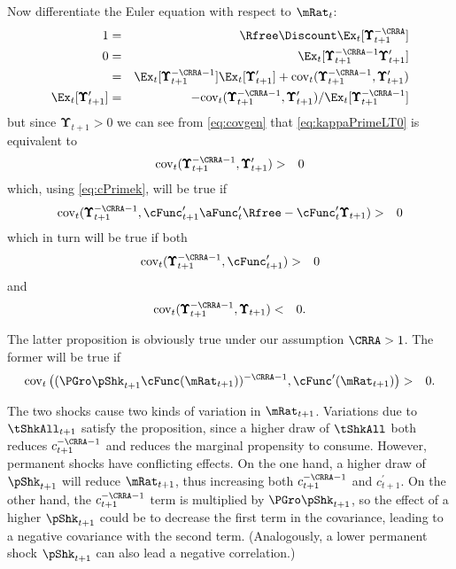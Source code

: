 \documentclass[titlepage]{\econtex}\providecommand{\texname}{BufferStockTheory}%
\begin{document}
{Now differentiate the Euler equation with respect to $\mRat_{t}$:
\begin{eqnarray}
  1 & = & \Rfree \Discount \Ex_{t}[ \pmb{\Upsilon}_{t+1}^{-\CRRA}] \notag
\\ 0 & = & \Ex_{t}[\pmb{\Upsilon}_{t+1}^{-\CRRA-1} \pmb{\Upsilon}_{t+1}^{\prime}] \notag
\\ & = & \Ex_{t}[\pmb{\Upsilon}_{t+1}^{-\CRRA-1}]\Ex_{t}[\pmb{\Upsilon}_{t+1}^{\prime}]+\mbox{cov}_{t}(\pmb{\Upsilon}_{t+1}^{-\CRRA-1},\pmb{\Upsilon}_{t+1}^{\prime}) \notag
\\ \Ex_{t}[\pmb{\Upsilon}_{t+1}^{\prime}] & = & -\mbox{cov}_{t}(\pmb{\Upsilon}_{t+1}^{-\CRRA-1},\pmb{\Upsilon}_{t+1}^{\prime})/\Ex_{t}[\pmb{\Upsilon}_{t+1}^{-\CRRA-1}] \label{eq:covgen}
\end{eqnarray}
but since $\pmb{\Upsilon}_{t+1} > 0$ we can see from \eqref{eq:covgen} that \eqref{eq:kappaPrimeLT0} is equivalent to
\begin{eqnarray}
 \mbox{cov}_{t}(\pmb{\Upsilon}_{t+1}^{-\CRRA-1},\pmb{\Upsilon}_{t+1}^{\prime}) & > & 0 \nonumber
\end{eqnarray}
which, using \eqref{eq:cPrimek}, will be true if
\begin{eqnarray}
 \mbox{cov}_{t}(\pmb{\Upsilon}_{t+1}^{-\CRRA-1},\cFunc^{\prime}_{t+1}\aFunc^{\prime}_{t}\Rfree - \cFunc^{\prime}_{t}\pmb{\Upsilon}_{t+1}) & > & 0 \notag
\end{eqnarray}
which in turn will be true if both
\begin{eqnarray}
  \mbox{cov}_{t}(\pmb{\Upsilon}_{t+1}^{-\CRRA-1},\cFunc^{\prime}_{t+1} ) & > & 0 \notag
\end{eqnarray}
and
\begin{eqnarray*}
  \mbox{cov}_{t}(\pmb{\Upsilon}_{t+1}^{-\CRRA-1},\pmb{\Upsilon}_{t+1}) & < & 0. \notag
\end{eqnarray*}

The latter proposition is obviously true under our assumption $\CRRA > 1$.  The former will be true if
\begin{eqnarray*}
  \mbox{cov}_{t}\left((\PGro \pShk_{t+1} \cFunc(\mRat_{t+1}))^{-\CRRA-1},\cFunc^{\prime}(\mRat_{t+1}) \right) & > & 0 \nonumber.
\end{eqnarray*}}

The two shocks cause two kinds of variation in $\mRat_{t+1}$.
Variations due to $\tShkAll_{t+1}$ satisfy the proposition, since a
higher draw of $\tShkAll$ both reduces $c_{t+1}^{-\CRRA-1}$ and
reduces the marginal propensity to consume.  However, permanent shocks
have conflicting effects.  On the one hand, a higher draw of
$\pShk_{t+1}$ will reduce $\mRat_{t+1}$, thus increasing both
$c_{t+1}^{-\CRRA-1}$ and $c_{t+1}^{\prime}$.  On the other hand, the
$c_{t+1}^{-\CRRA-1}$ term is multiplied by $\PGro \pShk_{t+1}$, so the
effect of a higher $\pShk_{t+1}$ could be to decrease the first term
in the covariance, leading to a negative covariance with the second
term.  (Analogously, a lower permanent shock $\pShk_{t+1}$ can also
lead a negative correlation.)
\end{document}
